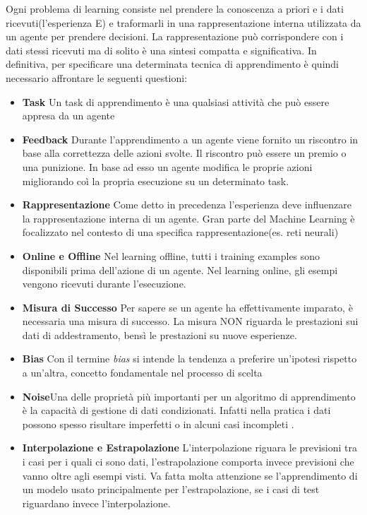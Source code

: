 Ogni problema di learning consiste nel prendere la conoscenza a priori e i dati ricevuti(l'esperienza E) e 
traformarli in una rappresentazione  interna utilizzata da un agente per prendere decisioni. La rappresentazione
può corrispondere con i dati stessi ricevuti ma di solito è una sintesi compatta e significativa. 
In definitiva, per specificare una determinata tecnica di apprendimento è quindi necessario affrontare le seguenti\cite{PooleMackworth17} questioni:
\begin{itemize}
  \item \textbf{Task} Un task di apprendimento è una qualsiasi attività che può essere appresa da un agente
  \item \textbf{Feedback} Durante l'apprendimento a un agente viene fornito un riscontro in base alla correttezza delle azioni svolte. Il riscontro può essere un premio o una punizione.  In base ad esso un agente modifica le proprie azioni
  migliorando coì la propria esecuzione su un determinato task.
  \item \textbf{Rappresentazione} Come detto in precedenza l'esperienza deve influenzare la rappresentazione interna di un agente.
  Gran parte del Machine Learning è focalizzato nel contesto di una specifica rappresentazione(es. reti neurali)
  \item \textbf{Online e Offline} Nel learning offline, tutti i training examples sono disponibili prima dell'azione di un agente. Nel learning online,
  gli esempi vengono ricevuti durante l'esecuzione.
  \item \textbf{Misura di Successo} Per sapere se un agente ha effettivamente imparato, è necessaria una misura di successo. La misura NON riguarda le prestazioni sui dati di addestramento, bensì le prestazioni su nuove esperienze.
  \item \textbf{Bias} Con il termine \emph{bias} si intende la tendenza a preferire un'ipotesi rispetto a un'altra, concetto fondamentale nel processo di scelta
  \item \textbf{Noise}Una delle proprietà più importanti per un algoritmo di apprendimento è la capacità di gestione di dati condizionati.
  Infatti nella pratica i dati possono spesso risultare imperfetti o in alcuni casi incompleti .
  \item \textbf{Interpolazione e Estrapolazione} L'interpolazione riguara le previsioni tra i  casi per i quali ci sono dati, l'estrapolazione comporta invece 
  previsioni che vanno oltre agli esempi visti. Va fatta molta attenzione se l'apprendimento di un modelo usato principalmente per l'estrapolazione, se i casi di test riguardano invece l'interpolazione.
\end{itemize}
